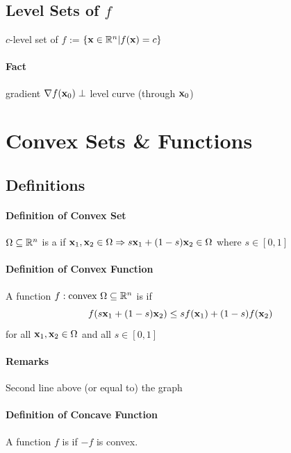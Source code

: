 \documentclass[11pt]{article}
\begin{document}
\subsection{Level Sets of $f$}
$c$-level set of $f$ := $\{ \textbf{x} \in \mathbb{R}^n | f(\textbf{x}) = c\}$
\paragraph{Fact} gradient $\nabla f(\textbf{x}_0) \perp$ level curve (through $\textbf{x}_0$)

\section{Convex Sets \& Functions}
\subsection{Definitions}
\paragraph{Definition of Convex Set}
$\Omega \subseteq \mathbb{R}^n$ is a  if
$\textbf{x}_1, \textbf{x}_2 \in \Omega \Rightarrow s\textbf{x}_1 + (1-s)\textbf{x}_2 \in \Omega$ where $s \in [0,1]$
\paragraph{Definition of Convex Function}
A function $f: \text{convex } \Omega \subseteq \mathbb{R}^n$ is  if 
$$f(s\textbf{x}_1 + (1-s)\textbf{x}_2) \leq sf(\textbf{x}_1) + (1-s)f(\textbf{x}_2)$$
for all $\textbf{x}_1, \textbf{x}_2 \in \Omega$ and all $s \in [0, 1]$
\paragraph{Remarks}
Second line above (or equal to) the graph
\paragraph{Definition of Concave Function}
A function $f$ is  if $-f$ is convex.
\end{document}

